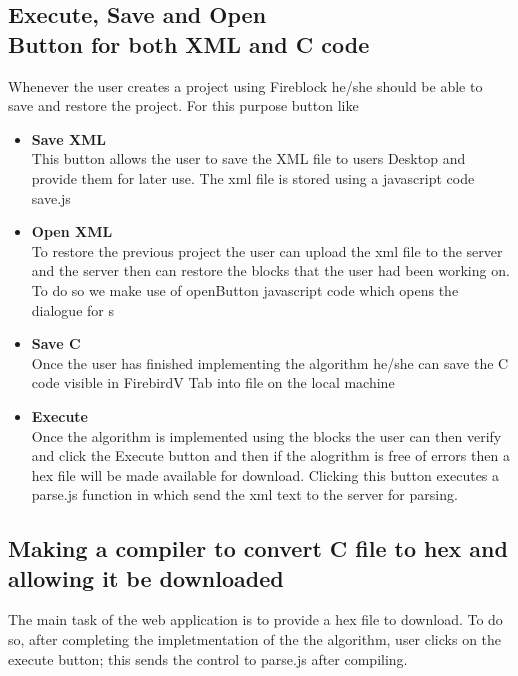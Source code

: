 \documentclass[a4paper,12pt,oneside]{book}
\begin{document}
\subsection{Execute, Save and Open \\ Button for both XML and C code}
   Whenever the user creates a project using Fireblock he/she should be able to save and restore the project. For this purpose button like
   \begin{itemize}
     \item \textbf{Save XML}\\
      This button allows the user to save the XML file to users Desktop and provide them for later use.
      The xml file is stored using a javascript code save.js
     \item \textbf{Open XML}\\
     To restore the previous project the user can upload the xml file to the server and the server then can restore the blocks that the user had been working on.
     To do so we make use of openButton javascript code which opens the dialogue for s
     \item \textbf{Save C}\\
     Once the user has finished implementing the algorithm he/she can save the C code visible in FirebirdV Tab into file on the local machine
     \item \textbf{Execute}\\
     Once the algorithm is implemented using the blocks the user can then verify and click the Execute button and then if the alogrithm is free of errors
     then a hex file will be made available for download. Clicking this button executes a parse.js function in which send the xml text to the server for parsing.
   \end{itemize}
\newpage
\subsection{Making a compiler to convert C file to hex and allowing it be downloaded} 
    The main task of the web application is to provide a hex file to download. To do so, after completing the impletmentation of the the algorithm,
    user clicks on the execute button; this sends the control to parse.js after compiling. 
    
\end{document}
